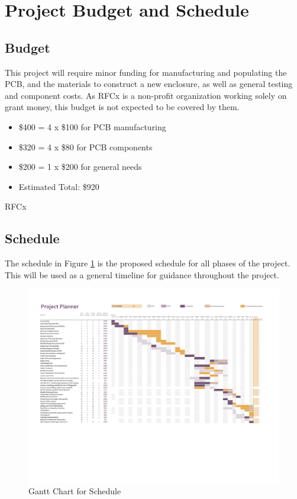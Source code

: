 \documentclass{article}
\numberwithin{figure}{section}
\numberwithin{equation}{section}
\begin{document}
{\section{Project Budget and Schedule} \label{sect:budgetandschedule}
\subsection{Budget} \label{sect:budget}
This project will require minor funding for manufacturing and populating the PCB, and the materials to construct a new enclosure, as well as general testing and component costs. As RFCx is a non-profit organization working solely on grant money, this budget is not expected to be covered by them.
\begin{itemize}
\item \$400 = 4 x \$100 for PCB manufacturing
\item \$320 = 4 x \$80 for PCB components
\item \$200 = 1 x \$200 for general needs
\item Estimated Total: \$920
\end{itemize}

RFCx

\begin{landscape}
\subsection{Schedule} \label{sect:schedule}
The schedule in Figure \ref{fig:gantt} is the proposed schedule for all phases of the project. This will be used as a general timeline for guidance throughout the project.

\begin{figure}[H]
  \centering
  \includegraphics[scale=0.85, trim=0cm 5cm 0cm 0cm, clip=true]{Schedule.pdf}
  \caption{Gantt Chart for Schedule}
  \label{fig:gantt}
\end{figure}
\end{landscape}

}
\end{document}
